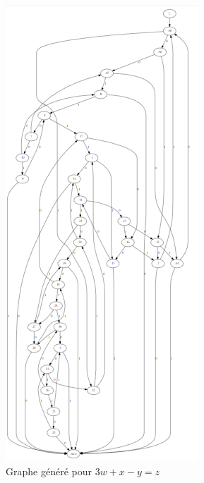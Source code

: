 \begin{figure}

\includegraphics[scale=0.5]{graphe.png}

\caption{Graphe généré pour $3w+x-y=z$}
\label{image1}
\end{figure}
